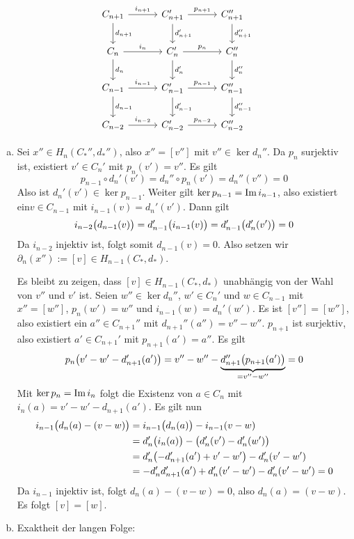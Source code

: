 \[
	\begin{tikzcd}[row sep=2em, column sep=3em]
		C_{n+1} \rar["i_{n+1}"] \dar["d_{n+1}"] & C_{n+1}' \rar["p_{n+1}"] \dar["d_{n+1}'"] & C_{n+1}'' \dar["d_{n+1}''"] \\
		C_n \rar["i_n"] \dar["d_{n}"]& C_n' \rar["p_n"] \dar["d_{n}'"]& C_n'' \dar["d_{n}''"]\\
		C_{n-1} \rar["i_{n-1}"] \dar["d_{n-1}"]& C_{n-1}'  \rar["p_{n-1}"] \dar["d_{n-1}'"]& C_{n-1}'' \dar["d_{n-1}''"]\\
		C_{n-2} \rar["i_{n-2}"]& C_{n-2}' \rar["p_{n-2}"] & C_{n-2}''
	\end{tikzcd}
\]
\begin{enumerate}[a)]
	\item Sei $x'' \in H_n(C_*'',d_*'')$, also $x'' = [v'']$ mit $v'' \in \ker d_n''$. Da $p_n$ surjektiv ist, existiert $v' \in C_n'$ mit $p_n(v')=v''$. Es gilt
	\[
		p_{n-1} \circ d_n'(v') = d_n'' \circ p_n(v') = d_n''(v'') = 0
	\]
	Also ist $d_n'(v') \in \ker p_{n-1}$. Weiter gilt $\ker p_{n-1}= \im i_{n-1}$, also existiert ein$ v\in C_{n-1}$ mit $i_{n-1}(v)= d_n'(v')$. Dann gilt
	\[
		i_{n-2} \enbrace[\big]{d_{n-1}(v)} = d'_{n-1} \enbrace[\big]{i_{n-1}(v)} = d_{n-1}' \enbrace[\big]{d_n'(v')} = 0   
	\]
	Da $i_{n-2}$ injektiv ist, folgt somit $d_{n-1}(v)=0$. Also setzen wir $\partial_n(x'') := [v] \in H_{n-1}(C_*,d_*)$. 
	
	Es bleibt zu zeigen, dass $[v] \in H_{n-1}(C_*,d_*)$ unabhängig von der Wahl von $v''$ und $v'$ ist.
	Seien $w'' \in \ker d_n''$, $w' \in C_n'$ und  $w \in C_{n-1}$ mit $x''=[w'']$, $p_n(w')=w''$ und $i_{n-1}(w)= d_n'(w')$.
	Es ist $[v'']=[w'']$, also existiert ein $a'' \in C_{n+1}''$ mit $d_{n+1}'' (a'')=v'' - w''$. $p_{n+1}$ ist surjektiv, also existiert $a' \in C_{n+1}'$ mit
	$p_{n+1}(a')=a''$. Es gilt
	\[
		p_n \enbrace[\big]{v'-w'- d_{n+1}'(a')} = v'' - w'' - \underbrace{d_{n+1}'' \enbrace[\big]{p_{n+1}(a')}}_{=v''- w''} = 0
	\]
	Mit $\ker p_n = \im i_n$ folgt die Existenz von $a \in C_n$ mit $i_n(a)=v'- w' - d_{n+1}(a')$. Es gilt nun %
	\begin{align*}
		i_{n-1} \enbrace[\big]{d_n(a)- (v-w)} & = i_{n-1} \enbrace[\big]{d_n(a)} - i_{n-1}(v-w) \\ &= d_n' \enbrace[\big]{i_n(a)} - \enbrace[\big]{d_n'(v')- d_n'(w')}  \\  
		&= d_n' \enbrace*{ -d_{n+1}'(a') + v'-w'} - d_n' \enbrace*{v' - w'}  \\
		&= -d_n' d_{n+1}' (a') + d_n'(v'- w') -  d_n'(v'-w') = 0
	\end{align*}
	Da $i_{n-1}$ injektiv ist, folgt $d_n(a)- (v-w) = 0$, also $d_n(a)=(v-w)$. Es folgt $[v]=[w]$.
	\item Exaktheit der langen Folge:
	\begin{description}[wide=0cm]
		\item[{$\boxed{\im (i_n)_* = \ker (p_n)_*}$ :}] 
		\enquote{$\subseteq$} folgt aus $(p_n)_* \circ (i_n)_* = \enbrace*{p_n \circ i_n}_* = (0)_* =0 $.
		

\end{description}
\end{enumerate}
